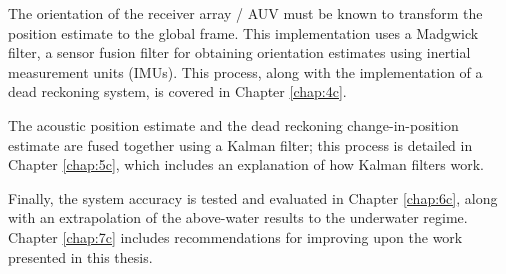 \documentclass[12pt,a4paper]{report}
\begin{document}
The orientation of the receiver array / AUV must be known to transform the position estimate to the global frame. This implementation uses a Madgwick filter, a sensor fusion filter for obtaining orientation estimates using inertial measurement units (IMUs). This process, along with the implementation of a dead reckoning system, is covered in Chapter \ref{chap:4c}.

The acoustic position estimate and the dead reckoning change-in-position estimate are fused together using a Kalman filter; this process is detailed in Chapter \ref{chap:5c}, which includes an explanation of how Kalman filters work.

Finally, the system accuracy is tested and evaluated in Chapter \ref{chap:6c}, along with an extrapolation of the above-water results to the underwater regime. Chapter \ref{chap:7c} includes recommendations for improving upon the work presented in this thesis.




\end{document}
